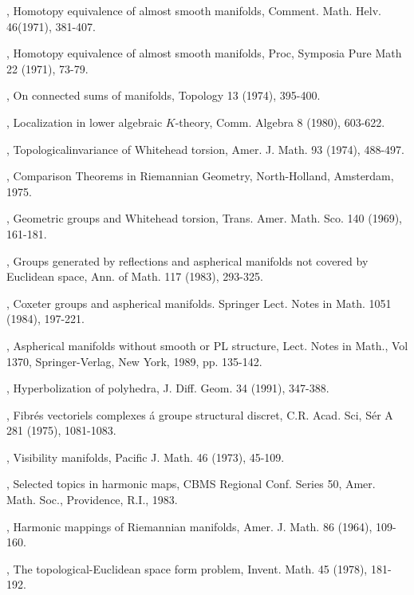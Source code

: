 \begin{thebibliography}{99}
, Homotopy equivalence of almost smooth
  manifolds, Comment. Math. Helv. 46(1971), 381-407.

, Homotopy equivalence of almost smooth
  manifolds, Proc, Symposia Pure Math 22 (1971), 73-79.

, On connected sums of manifolds, Topology 13
  (1974), 395-400.

, Localization in lower algebraic $K$-theory,
  Comm. Algebra 8 (1980), 603-622.

, Topological\pageoriginale invariance of Whitehead torsion,
  Amer. J. Math. 93 (1974), 488-497.

, Comparison Theorems in
  Riemannian Geometry, North-Holland, Amsterdam, 1975.

, Geometric groups and
  Whitehead torsion, Trans. Amer. Math. Sco. 140 (1969), 161-181.

, Groups generated by reflections and aspherical
  manifolds not covered by Euclidean space, Ann. of Math. 117 (1983),
  293-325. 

, Coxeter groups and aspherical
  manifolds. Springer Lect. Notes in Math. 1051 (1984), 197-221.

, Aspherical manifolds without
  smooth or PL structure, Lect. Notes in Math., Vol 1370,
  Springer-Verlag, New York, 1989, pp. 135-142.

, Hyperbolization of
  polyhedra, J. Diff. Geom. 34 (1991), 347-388.

, Fibr\'es vectoriels
  complexes \'a groupe structural discret, C.R. Acad. Sci, S\'er A 281
  (1975), 1081-1083.

, Visibility manifolds, Pacific
  J. Math. 46 (1973), 45-109.

, Selected topics in harmonic
  maps, CBMS Regional Conf. Series 50, Amer. Math. Soc., Providence,
  R.I., 1983.

, Harmonic mappings of
  Riemannian manifolds, Amer. J. Math. 86 (1964), 109-160.

, The topological-Euclidean
  space form problem, Invent. Math. 45 (1978), 181-192.


\end{thebibliography}
